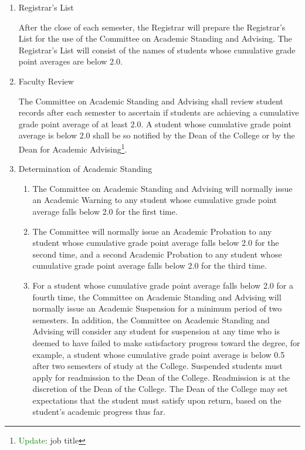 \documentclass{manual}
\newcommand{\modified}[1]{}
\newcommand{\editRemark}[3]{\textcolor{green}{#2}\footnote{\textcolor{green}{#1}: #3}}
\newcommand{\itemLevelA}{\alph*.}
\newcommand{\itemLevelB}{\arabic*)}
\newcommand{\itemRefA}{\alph*}
\newcommand{\itemRefB}{\arabic*}
\begin{document}
\begin{enumerate}[label=\itemLevelA,ref=\itemRefA]
\item Registrar's List \modified{4/14/09}

      After the close of each semester, the Registrar will prepare the Registrar's List for the use of the        Committee on Academic Standing and Advising. The Registrar's List will consist of the names of        students whose cumulative grade point averages are below 2.0.

\item Faculty Review \modified{4/14/09}        

The Committee on Academic Standing and Advising shall review student records after each semester to ascertain if students are achieving a cumulative grade point average of at least 2.0. A student whose cumulative grade point average is below 2.0 shall be so notified by the Dean of the College or by the Dean for Academic Advising\editRemark{Update}{}{job title}.

\item Determination of Academic Standing \modified{4/14/09}       

\begin{enumerate}[label=\itemLevelB,ref=\itemRefB]
\item The Committee on Academic Standing and Advising will normally issue an Academic Warning to any student whose cumulative grade point average falls below 2.0 for the first time. 
\item The Committee will normally issue an Academic Probation to any student whose cumulative grade point average falls below 2.0 for the second time, and a second Academic Probation to any student whose cumulative grade point average falls below 2.0 for the third time. 
\item For a student whose cumulative grade point average falls below 2.0 for a fourth time, the Committee on Academic Standing and Advising will normally issue an Academic Suspension for a minimum period of two semesters. In addition, the Committee on Academic Standing and Advising will consider any student for suspension at any time\modified{5/08/12} who is deemed to have failed to make satisfactory progress toward the degree, for example, a student whose cumulative grade point average is below 0.5 after two semesters of study at the College. Suspended students must apply for readmission to the Dean of the College. Readmission is at the discretion of the Dean of the College. The Dean of the College may set expectations that the student must satisfy upon return, based on the student's academic progress thus far.
\end{enumerate}


\end{enumerate}
\end{document}
